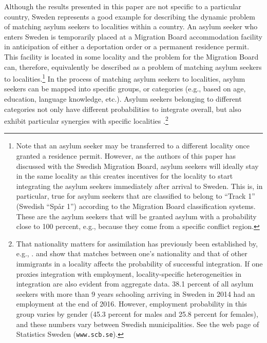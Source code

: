 \documentclass[12pt,fleqn]{article}
\begin{document}
Although the results presented in this paper are not specific to a particular country, Sweden represents a good example for describing the dynamic problem of matching asylum seekers to localities within a country. An asylum seeker who enters Sweden is temporarily placed at a Migration Board accommodation facility in anticipation of either a deportation order or a permanent residence permit. This facility is located in some locality and the problem for the Migration Board can, therefore, equivalently be described as a problem of matching asylum seekers to localities.\footnote{Note that an asylum seeker may be transferred to a different locality once granted a residence permit. However, as the authors of this paper has discussed with the Swedish Migration Board, asylum seekers will ideally stay in the same locality as this creates incentives for the locality to start integrating the asylum seekers immediately after arrival to Sweden. This is, in particular, true for asylum seekers that are classified to belong to ``Track 1'' (Swedish ``Sp\aa r 1'') according to the Migration Board classification systems. These are the asylum seekers that will be granted asylum with a probability close to 100 percent, e.g., because they come from a specific conflict region.} In the process of matching asylum seekers to localities, asylum seekers can be mapped into specific groups, or categories (e.g., based on age, education, language knowledge, etc.). Asylum seekers belonging to different categories not only have different probabilities to integrate overall, but also exhibit particular synergies with specific localities \citep{bib:BansakEtAl}.\footnote{That nationality matters for assimilation has previously been established by, e.g., \citet{bib:RanEtAl}. \citet{bib:EdinEtAl} and \citet{bib:Damm} show that matches between one's nationality and that of other immigrants in a locality affects the probability of successful integration. If one proxies integration with employment,  locality-specific heterogeneities in integration are also evident from aggregate data. 38.1 percent of all asylum seekers with more than 9 years schooling arriving in Sweden in 2014 had an employment at the end of 2016. However, employment probability in this group varies by gender (45.3 percent for males and 25.8 percent for females), and these numbers vary between Swedish municipalities. See the web page of Statistics Sweden (\texttt{www.scb.se}).}
\end{document}
